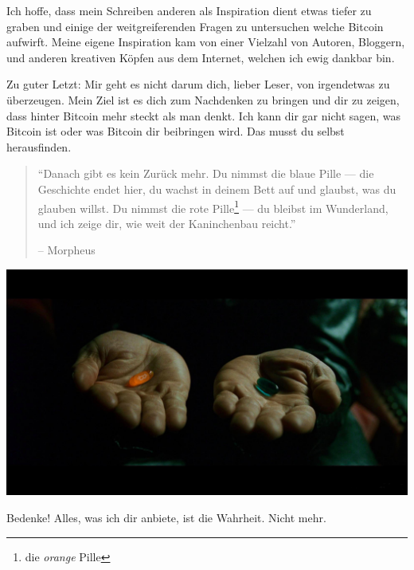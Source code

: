 Ich hoffe, dass mein Schreiben anderen als Inspiration dient etwas tiefer
zu graben und einige der weitgreiferenden Fragen zu untersuchen welche Bitcoin
aufwirft. Meine eigene Inspiration kam von einer Vielzahl von Autoren, Bloggern,
und anderen kreativen Köpfen aus dem Internet, welchen ich ewig dankbar bin.

Zu guter Letzt: Mir geht es nicht darum dich, lieber Leser, von irgendetwas zu
überzeugen. Mein Ziel ist es dich zum Nachdenken zu bringen und dir zu zeigen,
dass hinter Bitcoin mehr steckt als man denkt. Ich kann dir gar nicht sagen,
was Bitcoin ist oder was Bitcoin dir beibringen wird. Das musst du selbst
herausfinden.

\begin{quotation}\begin{samepage}
\enquote{Danach gibt es kein Zurück mehr. Du nimmst die blaue Pille --- die
Geschichte endet hier, du wachst in deinem Bett auf und glaubst, was du glauben
willst. Du nimmst die rote Pille\footnote{die \textit{orange} Pille} --- du
bleibst im Wunderland, und ich zeige dir, wie weit der Kaninchenbau reicht.}
\begin{flushright} -- Morpheus
\end{flushright}\end{samepage}\end{quotation}

\begin{center}
  \includegraphics[width=\textwidth]{assets/images/bitcoin-orange-pill.jpg}
  \caption*{Bedenke! Alles, was ich dir anbiete, ist die Wahrheit. Nicht mehr.}
  \label{fig:bitcoin-orange-pill}
\end{center}

%
%
%
